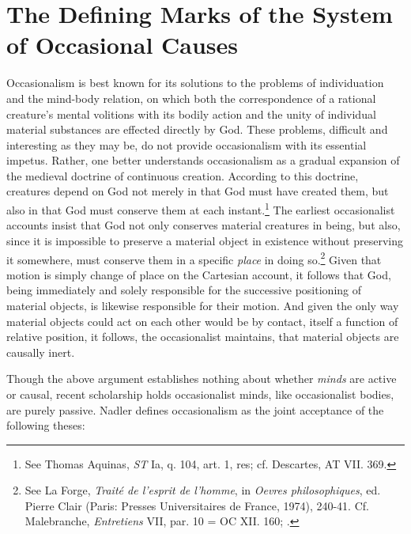 \documentclass[]{article}
\title{}
\author{}
\begin{document}
\maketitle

\begin{abstract}

\end{abstract}

\section{The Defining Marks of the System of Occasional Causes}
Occasionalism is best known for its solutions to the problems of individuation and the mind-body relation, on which both the correspondence of a rational creature's mental volitions with its bodily action and the unity of individual material substances are effected directly by God. These problems, difficult and interesting as they may be, do not provide occasionalism with its essential impetus. Rather, one better understands occasionalism as a gradual expansion of the medieval doctrine of continuous creation. According to this doctrine, creatures depend on God not merely in that God must have created them, but also in that God must conserve them at each instant.\footnote{See Thomas Aquinas, \emph{ST} Ia, q. 104, art. 1, res; cf. Descartes, AT VII. 369.} The earliest occasionalist accounts insist that God not only conserves material creatures in being, but also, since it is impossible to preserve a material object in existence without preserving it somewhere, must conserve them in a specific \emph{place} in doing so.\footnote{See La Forge, \emph{Traité de l'esprit de l'homme}, in \emph{Oevres philosophiques}, ed. Pierre Clair (Paris: Presses Universitaires de France, 1974), 240-41. Cf. Malebranche, \emph{Entretiens} VII, par. 10 = OC XII. 160; \autocite{Nadler1998}.} Given that motion is simply change of place on the Cartesian account, it follows that God, being immediately and solely responsible for the successive positioning of material objects, is likewise responsible for their motion. And given the only way material objects could act on each other would be by contact, itself a function of relative position, it follows, the occasionalist maintains, that material objects are causally inert.

Though the above argument establishes nothing about whether \emph{minds} are active or causal, recent scholarship holds occasionalist minds, like occasionalist bodies, are purely passive. Nadler defines occasionalism as the joint acceptance of the following theses:
\end{document}
